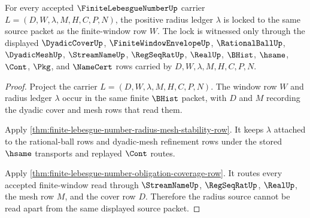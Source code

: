 \begin{theorem}
\label{thm:finite-lebesgue-number-window-radius-source-lock}
For every accepted $\FiniteLebesgueNumberUp$ carrier $L=(D,W,\lambda,M,H,C,P,N)$, the positive radius ledger $\lambda$ is locked to the same source packet as the finite-window row $W$. The lock is witnessed only through the displayed $\DyadicCoverUp$, $\FiniteWindowEnvelopeUp$, $\RationalBallUp$, $\DyadicMeshUp$, $\StreamNameUp$, $\RegSeqRatUp$, $\RealUp$, $\BHist$, $\hsame$, $\Cont$, $\Pkg$, and $\NameCert$ rows carried by $D,W,\lambda,M,H,C,P,N$.
\end{theorem}
\begin{proof}
Project the carrier $L=(D,W,\lambda,M,H,C,P,N)$. The window row $W$ and radius ledger $\lambda$ occur in the same finite $\BHist$ packet, with $D$ and $M$ recording the dyadic cover and mesh rows that read them.

Apply \autoref{thm:finite-lebesgue-number-radius-mesh-stability-row}. It keeps $\lambda$ attached to the rational-ball rows and dyadic-mesh refinement rows under the stored $\hsame$ transports and replayed $\Cont$ routes.

Apply \autoref{thm:finite-lebesgue-number-obligation-coverage-row}. It routes every accepted finite-window read through $\StreamNameUp$, $\RegSeqRatUp$, $\RealUp$, the mesh row $M$, and the cover row $D$. Therefore the radius source cannot be read apart from the same displayed source packet.
\end{proof}

